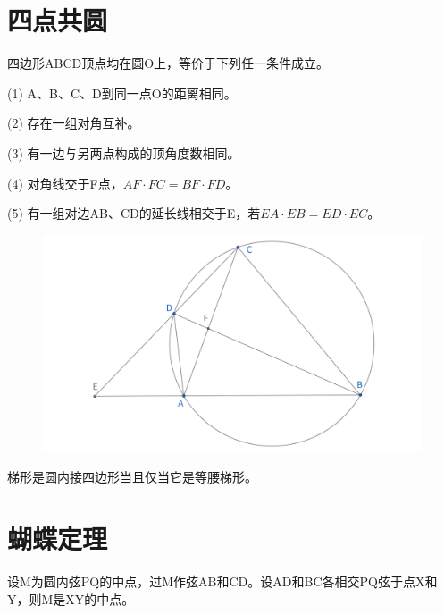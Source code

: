 \section{四点共圆}
\begin{proposition}[四点共圆判定方法]
    四边形ABCD顶点均在圆O上，等价于下列任一条件成立。

    (1) A、B、C、D到同一点O的距离相同。

    (2) 存在一组对角互补。

    (3) 有一边与另两点构成的顶角度数相同。

    (4) 对角线交于F点，$AF\cdot FC = BF\cdot FD$。

    (5) 有一组对边AB、CD的延长线相交于E，若$EA\cdot EB = ED\cdot EC$。
\end{proposition}
\begin{figure}[H]
    \centering
    \includegraphics[width=\linewidth]{figures/四点共圆.png}
\end{figure}


\begin{exercise}
梯形是圆内接四边形当且仅当它是等腰梯形。
\end{exercise}


\newpage 
\section{蝴蝶定理}
\begin{theorem}
    设M为圆内弦PQ的中点，过M作弦AB和CD。设AD和BC各相交PQ弦于点X和Y，则M是XY的中点。
\end{theorem}

